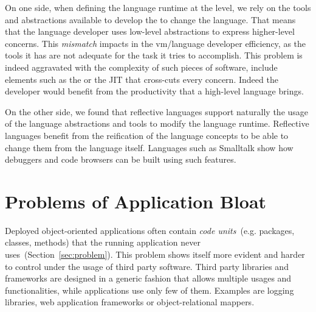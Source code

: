 On one side, when defining the language runtime at the \VM level, we rely on the tools and abstractions available to develop the \VM to change the language. That means that the language developer uses low-level abstractions to express higher-level concerns. This \emph{mismatch} impacts in the vm/language developer efficiency, as the tools it has are not adequate for the task it tries to accomplish. This problem is indeed aggravated with the complexity of such pieces of software, include elements such as the \GC or the JIT that cross-cuts every \VM concern. Indeed the developer would benefit from the productivity that a high-level language brings.


On the other side, we found that reflective languages support naturally the usage of the language abstractions and tools to modify the language runtime. Reflective languages benefit from the reification of the language concepts to be able to change them from the language itself. Languages such as Smalltalk show how debuggers and code browsers can be built using such features.

\section{Problems of Application Bloat}

Deployed object-oriented applications often contain \emph{code units}~(e.g. packages, classes, methods) that the running application never uses~(Section~\ref{sec:problem}).
This problem shows itself more evident and harder to control under the usage of third party software. 
Third party libraries and frameworks are designed in a generic fashion that allows multiple usages and functionalities, while applications use only few of them. 
Examples are logging libraries, web application frameworks or object-relational mappers.

